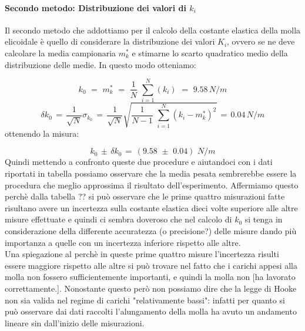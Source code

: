 \paragraph{Secondo metodo: Distribuzione dei valori di $k_i$\\}
Il secondo metodo che addottiamo per il calcolo della costante elastica della molla elicoidale è quello di considerare la distribuzione dei valori $K_i$, ovvero se ne deve calcolare la media campionaria $m^*_k$ e stimarne lo scarto quadratico medio della distribuzione delle medie. In questo modo otteniamo:

\begin{equation*}
	k_0 \,\,=\,\, m^*_k \,\,=\,\, \frac{1}{N}\,\,\sum_{i=1}^{N} (k_i) \,\,=\,\, 9.58  \,N/m
\end{equation*}
%
\begin{equation*}
	\delta k_0  \,=\, \frac{1}{\sqrt{N}} \sigma_{k_0} \,=\, \frac{1}{\sqrt{N}}\sqrt{\frac{1}{N - 1}\,\,\sum_{i=1}^{N} (k_i - m^*_k)^2}\,=\, 0.04 \,N/m
\end{equation*}
%
ottenendo la misura:

\begin{equation}
		k_0 \, \pm \, \delta k_0 \,=\, (9.58 \,\, \pm \,\, 0.04)\,\, N/m
\end{equation}
%
Quindi mettendo a confronto queste due procedure e aiutandoci con i dati riportati in tabella possiamo osservare che la media pesata sembrerebbe essere la procedura che meglio approssima il risultato dell'esperimento. Affermiamo questo perchè dalla tabella ?? si può osservare che le prime quattro misurazioni fatte risultano avere un incertezza sulla costante elastica dieci volte superiore alle altre misure effettuate e quindi ci sembra doveroso che nel calcolo di $k_0$ si tenga in considerazione della differente accuratezza (o precisione?) delle misure dando più importanza a quelle con un incertezza inferiore rispetto alle altre.\\
Una spiegazione al perchè in queste prime quattro misure l'incertezza risulti essere maggiore rispetto alle altre si può trovare nel fatto che i carichi appesi alla molla non fossero sufficientemente importanti, e quindi la molla non [ha lavorato correttamente.]. Nonostante questo però non possiamo dire che la legge di Hooke non sia valida nel regime di carichi "relativamente bassi": infatti per quanto si può osservare dai dati raccolti l'alungamento della molla ha avuto un andamento lineare sin dall'inizio delle misurazioni.

